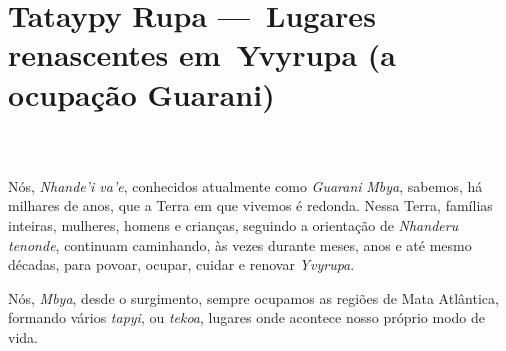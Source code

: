 
 

\part[Lugares renascentes em Yvyrupa]{Tataypy Rupa — Lugares renascentes em Yvyrupa (a ocupação Guarani)}\chapter*{}  

Nós, \emph{Nhande'i va'e}, conhecidos atualmente como \emph{Guarani}
\emph{Mbya}, sabemos, há milhares de anos, que a Terra em que vivemos é
redonda. Nessa Terra, famílias inteiras, mulheres, homens e crianças,
seguindo a orientação de \emph{Nhanderu tenonde}, continuam caminhando,
às vezes durante meses, anos e até mesmo décadas, para povoar, ocupar,
cuidar e renovar \emph{Yvyrupa}.

Nós, \emph{Mbya}, desde o surgimento, sempre ocupamos as regiões de Mata
Atlântica, formando vários \emph{tapyi}, ou \emph{tekoa}, lugares onde
acontece nosso próprio modo de vida.

 
